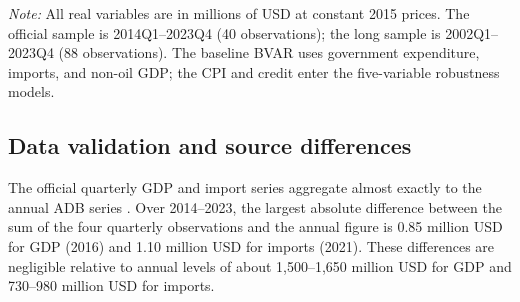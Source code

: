 \documentclass[11pt,a4paper]{article}
\begin{document}
\begin{table}[htbp]
\centering
\small
\caption{Variables, sources, and samples}
\label{tab:variables}
\par\vspace{0.3em}
\begin{minipage}{0.95\textwidth}
\footnotesize\textit{Note:} All real variables are in millions of USD at constant 2015 prices. The official sample is 2014Q1--2023Q4 (40 observations); the long sample is 2002Q1--2023Q4 (88 observations). The baseline BVAR uses government expenditure, imports, and non-oil GDP; the CPI and credit enter the five-variable robustness models.
\end{minipage}
\end{table}

\subsection{Data validation and source differences}
\label{sec:validation}

The official quarterly GDP and import series aggregate almost exactly to the annual ADB series \parencite{adb2025}. Over 2014--2023, the largest absolute difference between the sum of the four quarterly observations and the annual figure is 0.85 million USD for GDP (2016) and 1.10 million USD for imports (2021). These differences are negligible relative to annual levels of about 1,500--1,650 million USD for GDP and 730--980 million USD for imports.
\end{document}
